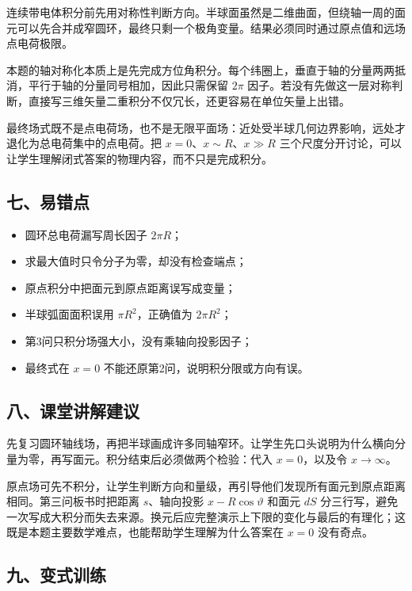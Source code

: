 \documentclass[12pt,a4paper,UTF8]{ctexart}
\newcommand{\tightlist}{\setlength{\itemsep}{0pt}\setlength{\parskip}{0pt}}
\begin{document}
连续带电体积分前先用对称性判断方向。半球面虽然是二维曲面，但绕轴一周的面元可以先合并成窄圆环，最终只剩一个极角变量。结果必须同时通过原点值和远场点电荷极限。

本题的轴对称化本质上是先完成方位角积分。每个纬圈上，垂直于轴的分量两两抵消，平行于轴的分量同号相加，因此只需保留
\(2\pi\)
因子。若没有先做这一层对称判断，直接写三维矢量二重积分不仅冗长，还更容易在单位矢量上出错。

最终场式既不是点电荷场，也不是无限平面场：近处受半球几何边界影响，远处才退化为总电荷集中的点电荷。把
\(x=0\)、\(x\sim R\)、\(x\gg R\)
三个尺度分开讨论，可以让学生理解闭式答案的物理内容，而不只是完成积分。

\subsection{七、易错点}\label{ux4e03ux6613ux9519ux70b9-5}

\begin{itemize}
\tightlist
\item
  圆环总电荷漏写周长因子 \(2\pi R\)；
\item
  求最大值时只令分子为零，却没有检查端点；
\item
  原点积分中把面元到原点距离误写成变量；
\item
  半球弧面面积误用 \(\pi R^2\)，正确值为 \(2\pi R^2\)；
\item
  第3问只积分场强大小，没有乘轴向投影因子；
\item
  最终式在 \(x=0\) 不能还原第2问，说明积分限或方向有误。
\end{itemize}

\subsection{八、课堂讲解建议}\label{ux516bux8bfeux5802ux8bb2ux89e3ux5efaux8bae-5}

先复习圆环轴线场，再把半球画成许多同轴窄环。让学生先口头说明为什么横向分量为零，再写面元。积分结束后必须做两个检验：代入
\(x=0\)，以及令 \(x\to\infty\)。

原点场可先不积分，让学生判断方向和量级，再引导他们发现所有面元到原点距离相同。第三问板书时把距离
\(s\)、轴向投影 \(x-R\cos\vartheta\) 和面元 \(dS\)
分三行写，避免一次写成大积分而失去来源。换元后应完整演示上下限的变化与最后的有理化；这既是本题主要数学难点，也能帮助学生理解为什么答案在
\(x=0\) 没有奇点。

\subsection{九、变式训练}\label{ux4e5dux53d8ux5f0fux8badux7ec3-5}
\end{document}
